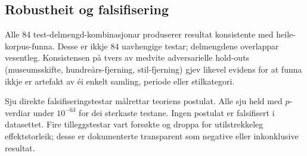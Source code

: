 \subsection{Robustheit og falsifisering}

Alle 84 test-delmengd-kombinasjonar produserer resultat konsistente med heile-korpus-funna. Desse er ikkje 84 uavhengige testar; delmengdene overlappar vesentleg. Konsistensen på tvers av medvite adversarielle hold-outs (museumsskifte, hundreårs-fjerning, stil-fjerning) gjev likevel evidens for at funna ikkje er artefakt av éi enkelt samling, periode eller stilkategori.

Sju direkte falsifiseringstestar målrettar teoriens postulat. Alle sju held med $p$-verdiar under $10^{-63}$ for dei sterkaste testane. Ingen postulat er falsifisert i datasettet. Fire tilleggstestar vart forsøkte og droppa for utilstrekkeleg effektstorleik; desse er dokumenterte transparent som negative eller inkonklusive resultat.
